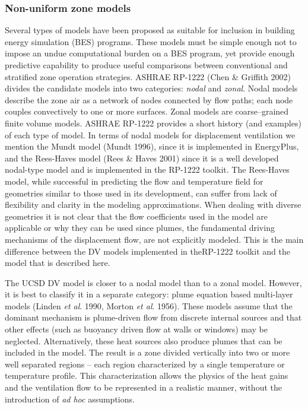 {\subsubsection{Non-uniform zone models}\label{non-uniform-zone-models}

Several types of models have been proposed as suitable for inclusion in building energy simulation (BES) programs. These models must be simple enough not to impose an undue computational burden on a BES program, yet provide enough predictive capability to produce useful comparisons between conventional and stratified zone operation strategies. ASHRAE RP-1222 (Chen \& Griffith 2002) divides the candidate models into two categories: \emph{nodal} and \emph{zonal}. Nodal models describe the zone air as a network of nodes connected by flow paths; each node couples convectively to one or more surfaces. Zonal models are coarse--grained finite volume models. ASHRAE RP-1222 provides a short history (and examples) of each type of model. In terms of nodal models for displacement ventilation we mention the Mundt model (Mundt 1996), since it is implemented in EnergyPlus, and the Rees-Haves model (Rees \& Haves 2001) since it is a well developed nodal-type model and is implemented in the RP-1222 toolkit. The Rees-Haves model, while successful in predicting the flow and temperature field for geometries similar to those used in its development, can suffer from lack of flexibility and clarity in the modeling approximations. When dealing with diverse geometries it is not clear that the flow coefficients used in the model are applicable or why they can be used since plumes, the fundamental driving mechanisms of the displacement flow, are not explicitly modeled. This is the main difference between the DV models implemented in theRP-1222 toolkit and the model that is described here.

The UCSD DV model is closer to a nodal model than to a zonal model. However, it is best to classify it in a separate category: plume equation based multi-layer models (Linden \emph{et al}. 1990, Morton \emph{et al}. 1956). These models assume that the dominant mechanism is plume-driven flow from discrete internal sources and that other effects (such as buoyancy driven flow at walls or windows) may be neglected. Alternatively, these heat sources also produce plumes that can be included in the model. The result is a zone divided vertically into two or more well separated regions -- each region characterized by a single temperature or temperature profile. This characterization allows the physics of the heat gains and the ventilation flow to be represented in a realistic manner, without the introduction of \emph{ad hoc} assumptions.

}

